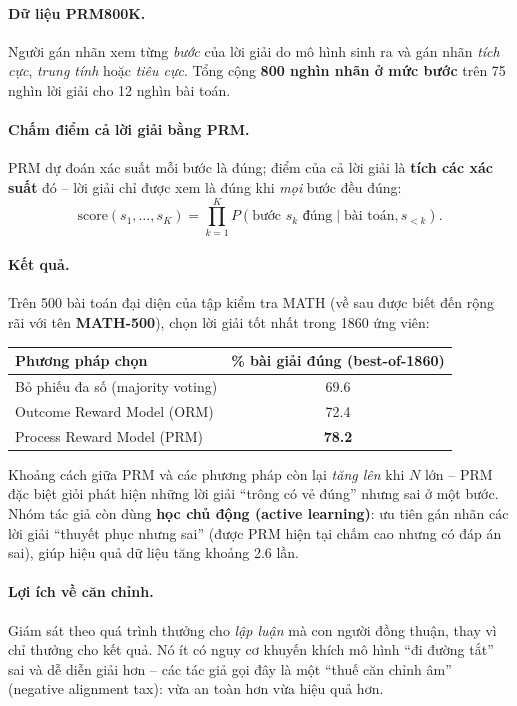 \paragraph{Dữ liệu PRM800K.} Người gán nhãn xem từng \emph{bước} của lời giải do mô hình sinh ra và gán nhãn \emph{tích cực}, \emph{trung tính} hoặc \emph{tiêu cực}. Tổng cộng \textbf{800 nghìn nhãn ở mức bước} trên 75 nghìn lời giải cho 12 nghìn bài toán.

\paragraph{Chấm điểm cả lời giải bằng PRM.} PRM dự đoán xác suất mỗi bước là đúng; điểm của cả lời giải là \textbf{tích các xác suất} đó -- lời giải chỉ được xem là đúng khi \emph{mọi} bước đều đúng:
\[
\text{score}(s_1, \dots, s_K) = \prod_{k=1}^{K} P(\text{bước } s_k \text{ đúng} \mid \text{bài toán}, s_{<k}).
\]

\paragraph{Kết quả.} Trên 500 bài toán đại diện của tập kiểm tra MATH (về sau được biết đến rộng rãi với tên \textbf{MATH-500}), chọn lời giải tốt nhất trong 1860 ứng viên:
\begin{center}
\begin{tabular}{@{}lc@{}}
\toprule
\textbf{Phương pháp chọn} & \textbf{\% bài giải đúng (best-of-1860)} \\
\midrule
Bỏ phiếu đa số (majority voting) & 69.6 \\
Outcome Reward Model (ORM) & 72.4 \\
Process Reward Model (PRM) & \textbf{78.2} \\
\bottomrule
\end{tabular}
\end{center}
Khoảng cách giữa PRM và các phương pháp còn lại \emph{tăng lên} khi $N$ lớn -- PRM đặc biệt giỏi phát hiện những lời giải “trông có vẻ đúng” nhưng sai ở một bước. Nhóm tác giả còn dùng \textbf{học chủ động (active learning)}: ưu tiên gán nhãn các lời giải “thuyết phục nhưng sai” (được PRM hiện tại chấm cao nhưng có đáp án sai), giúp hiệu quả dữ liệu tăng khoảng 2.6 lần.

\paragraph{Lợi ích về căn chỉnh.} Giám sát theo quá trình thưởng cho \emph{lập luận} mà con người đồng thuận, thay vì chỉ thưởng cho kết quả. Nó ít có nguy cơ khuyến khích mô hình “đi đường tắt” sai và dễ diễn giải hơn -- các tác giả gọi đây là một “thuế căn chỉnh âm” (negative alignment tax): vừa an toàn hơn vừa hiệu quả hơn.

